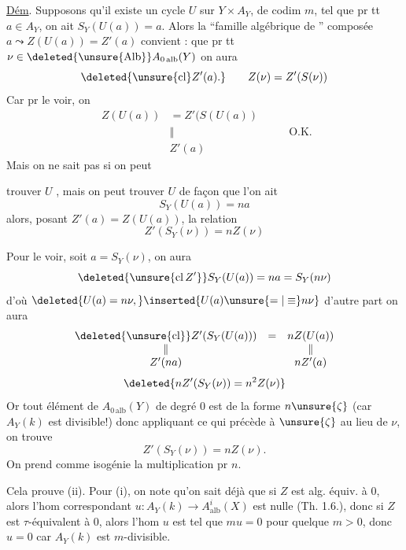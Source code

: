 \uline{Dém}. Supposons qu'il existe un cycle  \(U\) sur \(Y\times A_Y\), de codim \(m\), tel que pr tt \(a\in A_Y\), on ait \(S_Y(U(a))=a\). Alors la ``famille algébrique de '' composée \(a\leadsto Z(U(a))=Z'(a)\) convient :  que pr tt \(\nu\in\deleted{\unsure{\operatorname{Alb}}}A_{0\,\mathrm{alb}}(Y)\)  on aura
\[
\deleted{\unsure{\operatorname{cl}}Z'(a).}
\qquad Z(\nu)=Z'(S(\nu))
\]
Car pr le voir, on  
\[
\begin{aligned}
Z(U(a))&=Z'(S(U(a))\phantom{)}\\
&\Vert\\
&Z'(a)
\end{aligned}
\qquad\text{O.K.}
\]
Mais  on ne sait pas si on peut


trouver \(U\) , mais on peut trouver \(U\) de façon que l'on ait
\[
S_Y(U(a))=na
\]
alors, posant \(Z'(a)=Z(U(a))\), la relation
\[
Z'(S_Y(\nu))=nZ(\nu)
\]

Pour le voir, soit \(a=S_Y(\nu)\), on aura
\[
\deleted{\unsure{\operatorname{cl}Z'}}S_Y(U(a))=na=S_Y(n\nu)
\]
d'où \(\deleted{U(a)=n\nu,}\inserted{U(a)\unsure{=|\equiv}n\nu}\)
d'autre part on aura
\[
\begin{array}{ccc}
\deleted{\unsure{\operatorname{cl}}}Z'(S_Y(U(a)))&=&nZ(U(a))\\
\Vert&&\Vert\\
Z'(na)&&nZ'(a)
\end{array}
\]
\[
\deleted{nZ'(S_Y(\nu))=n^2Z(\nu)}
\]
Or tout élément de \(A_{0\,\mathrm{alb}}(Y)\) de degré 0 est de la forme \(n\unsure{\zeta}\) (car \(A_Y(k)\) est divisible!) donc appliquant ce qui précède à \(\unsure{\zeta}\) au lieu de \(\nu\), on trouve
\[
Z'(S_Y(\nu))=nZ(\nu).
\]
On prend comme isogénie la multiplication pr \(n\).


Cela prouve (ii). Pour (i), on note qu'on sait déjà que si \(Z\) est alg. équiv. à 0, alors l'hom correspondant \(u:A_Y(k)\longrightarrow A^i_{\mathrm{alb}}(X)\) est nulle (Th. 1.6.), donc si \(Z\) est \(\tau\)-équivalent à 0, alors l'hom \(u\) est tel que \(mu=0\) pour quelque \(m>0\), donc \(u=0\) car \(A_Y(k)\) est \(m\)-divisible.

